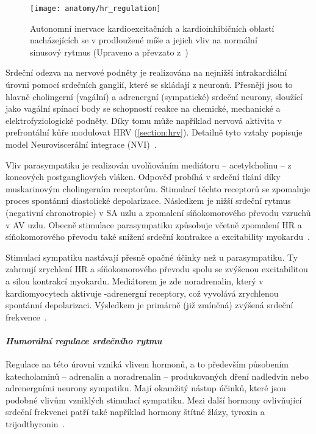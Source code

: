 \begin{figure}[h]
	\begin{center}
		\texttt{[image: anatomy/hr\_regulation]}
		\caption{Autonomní inervace kardioexcitačních a kardioinhibičních
			oblastí nacházejících se v prodloužené míše a jejich vliv na
			normální sinusový rytmus (Upraveno a převzato z~\cite{OpenStax})}
		\label{fig:hr_regulation}
	\end{center}
\end{figure}

Srdeční odezva na nervové podněty je realizována na nejnižší intrakardiální
úrovni pomocí srdečních ganglií, které se skládají z neuronů. Přesněji jsou to
hlavně cholingerní (vagální) a adrenergní (sympatické) srdeční neurony, sloužící
jako vagální spínací body se schopností reakce na chemické, mechanické a
elektrofyziologické podněty. Díky tomu může například nervová aktivita v
prefrontální kůře modulovat HRV (\ref{section:hrv}). Detailně tyto vztahy
popisuje model Neuroviscerální integrace (NVI)~\cite{Smith2017}.

Vliv parasympatiku je realizován uvolňováním mediátoru -- acetylcholinu -- z
koncových postgangliových vláken. Odpověď probíhá v srdeční tkání díky
muskarinovým cholingerním receptorům. Stimulací těchto receptorů se zpomaluje
proces spontánní diastolické depolarizace. Následkem je nižší srdeční rytmus
(negativní chronotropie) v SA uzlu a zpomalení síňokomorového převodu vzruchů v
AV uzlu. Obecně stimulace parasympatiku způsobuje včetně zpomalení HR a
síňokomorového převodu také snížení srdeční kontrakce a excitability
myokardu~\cite{Kittnar2020}.

Stimulací sympatiku nastávají přesně opačné účinky než u parasympatiku. Ty
zahrnují zrychlení HR a síňokomorového převodu spolu se zvýšenou excitabilitou a
silou kontrakcí myokardu. Mediátorem je zde noradrenalin, který v
kardiomyocytech aktivuje \textbeta-adrenergní receptory, což vyvolává zrychlenou
spontánní depolarizaci. Výsledkem je primárně (již zmíněná) zvýšená srdeční
frekvence~\cite{Kittnar2020}.

\paragraph*{\textit{Humorální regulace srdečního rytmu}\\} Regulace na této
úrovni vzniká vlivem hormonů, a to především působením katecholaminů --
adrenalin a noradrenalin -- produkovaných dření nadledvin nebo adrenergními
neurony sympatiku. Mají okamžitý nástup účinků, které jsou podobné vlivům
vzniklých stimulací sympatiku. Mezi další hormony ovlivňující srdeční frekvenci
patří také například hormony štítné žlázy, tyroxin a
trijodthyronin~\cite{Kittnar2020,Orel2019}.

